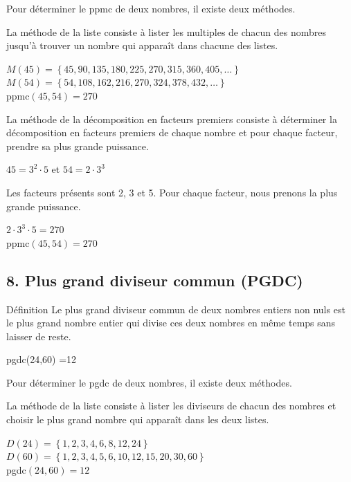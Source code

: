 \vspace{40pt}
Pour déterminer le ppmc de deux nombres, il existe deux méthodes.

\vspace{20pt}
La \textcolor{themeNO}{méthode de la liste} consiste à lister les multiples de chacun des nombres jusqu'à trouver un nombre qui apparaît dans chacune des listes.

$M\left(45\right)=\left\{45, 90, 135, 180, 225, 270, 315, 360, 405, \ldots \right\}$\\
$M\left(54\right)=\left\{54, 108, 162, 216, 270, 324, 378, 432, \ldots \right\}$\\
ppmc$(45,54) =270$


\vspace{20pt}
La \textcolor{themeNO}{méthode de la décomposition en facteurs premiers} consiste à déterminer la décomposition en facteurs premiers de chaque nombre et pour chaque facteur, prendre sa plus grande puissance.

$45=3^{2}\cdot 5$ \quad\quad et \quad\quad $54=2\cdot 3^3$

Les facteurs présents sont 2, 3 et 5. Pour chaque facteur, nous prenons la plus grande puissance.

$2\cdot 3^3\cdot 5=270$\\
ppmc$(45,54) =270$

\newpage
\subsection*{8.  Plus grand diviseur commun (PGDC)}

\begin{regle}{Définition}
Le \textcolor{themeNO}{plus grand diviseur commun} de deux nombres entiers non nuls est le plus grand nombre entier qui divise ces deux nombres en même temps sans laisser de reste.
\end{regle}

\begin{center}
pgdc(24,60) =12
\end{center}

\vspace{40pt}
Pour déterminer le pgdc de deux nombres, il existe deux méthodes.

\vspace{20pt}
La \textcolor{themeNO}{méthode de la liste} consiste à lister les diviseurs de chacun des nombres et choisir le plus grand nombre qui apparaît dans les deux listes.

$D\left(24\right)=\left\{1, 2, 3, 4, 6, 8, 12, 24\right\}$\\
$D\left(60\right)=\left\{1, 2, 3, 4, 5, 6, 10, 12, 15, 20, 30, 60\right\}$\\
pgdc$(24,60) =12$

